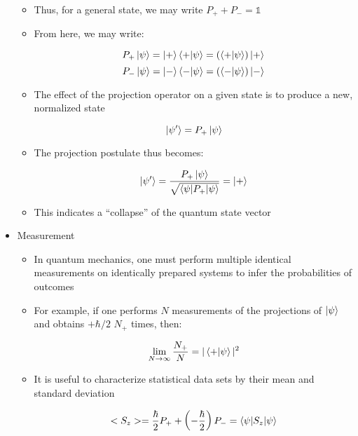 \begin{itemize}
\begin{itemize}
      \item Thus, for a general state, we may write $P_++P_-=\mathbb{1}$

      \item From here, we may write:

        $$P_+\ket{\psi}=\ket{+}\bra{+}\ket{\psi}=(\bra{+}\ket{\psi})\ket{+}$$
        $$P_-\ket{\psi}=\ket{-}\bra{-}\ket{\psi}=(\bra{-}\ket{\psi})\ket{-}$$

      \item The effect of the projection operator on a given state is to produce a new, normalized state

        $$\ket{\psi'}=P_+\ket{\psi}$$

      \item The projection postulate thus becomes:

        $$\ket{\psi'}=\frac{P_+\ket{\psi}}{\sqrt{\bra{\psi|P_+}\ket{\psi}}}=\ket{+}$$
        
      \item This indicates a ``collapse'' of the quantum state vector

    \end{itemize}

  \item Measurement

    \begin{itemize}

      \item In quantum mechanics, one must perform multiple identical measurements on identically prepared systems to infer the probabilities of outcomes

      \item For example, if one performs $N$ measurements of the projections of $\ket{\psi}$ and obtains $+\hbar/2$ $N_+$ times, then:

        $$\lim_{N\to\infty}\frac{N_+}{N}=|\bra{+}\ket{\psi}|^2$$

      \item It is useful to characterize statistical data sets by their mean and standard deviation

        $$<S_z>=\frac{\hbar}{2}P_++\left(-\frac{\hbar}{2}\right)P_-=\bra{\psi|S_z}\ket{\psi}$$

    \end{itemize}

\end{itemize}



